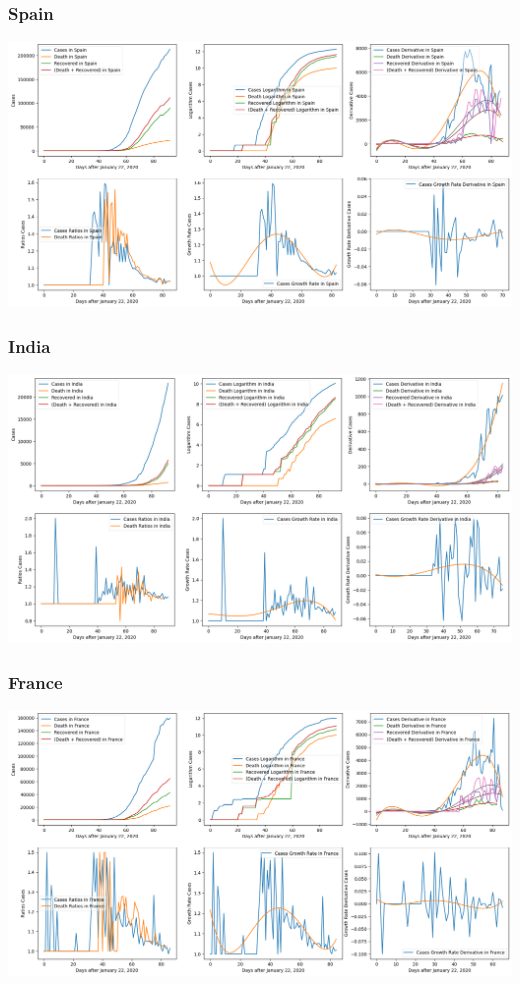 \documentclass{report}
\begin{document}
            \subsubsection{Spain}
                \begin{center}
                    \includegraphics[width=\textwidth]{plots/spain/analyze.png}
                \end{center}
            \subsubsection{India}
                \begin{center}
                    \includegraphics[width=\textwidth]{plots/india/analyze.png}
                \end{center}
            \subsubsection{France}
                \begin{center}
                    \includegraphics[width=\textwidth]{plots/france/analyze.png}
                \end{center}
\end{document}
